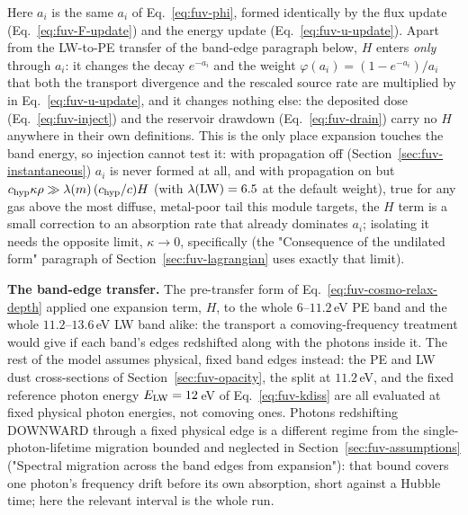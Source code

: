 Here $a_i$ is the same $a_i$ of Eq.~\ref{eq:fuv-phi}, formed identically by
the flux update (Eq.~\ref{eq:fuv-F-update}) and the energy update
(Eq.~\ref{eq:fuv-u-update}). Apart from the LW-to-PE transfer of the
band-edge paragraph below, $H$ enters \emph{only} through $a_i$: it changes the decay $e^{-a_i}$ and the
weight $\varphi(a_i) = (1-e^{-a_i})/a_i$ that both the transport
divergence and the rescaled source rate are multiplied by in
Eq.~\ref{eq:fuv-u-update}, and it changes nothing else: the deposited
dose (Eq.~\ref{eq:fuv-inject}) and the reservoir drawdown
(Eq.~\ref{eq:fuv-drain}) carry no $H$ anywhere in their own definitions.
This is the only place expansion touches the band energy, so injection
cannot test it: with propagation off (Section~\ref{sec:fuv-instantaneous})
$a_i$ is never formed at all, and with propagation on but
$c_{\rm hyp}\kappa\rho \gg \lambda(m)\,(c_{\rm hyp}/c)H$ (with $\lambda({\rm LW}) = 6.5$ at the default weight), true for any gas above the most
diffuse, metal-poor tail this module targets, the $H$ term is a small
correction to an absorption rate that already dominates $a_i$; isolating
it needs the opposite limit, $\kappa\to0$, specifically (the
"Consequence of the undilated form" paragraph of
Section~\ref{sec:fuv-lagrangian} uses exactly that limit).

\textbf{The band-edge transfer.} The pre-transfer form of
Eq.~\ref{eq:fuv-cosmo-relax-depth} applied one expansion term, $H$, to
the whole $6$--$11.2$\,eV PE band and the whole $11.2$--$13.6$\,eV LW
band alike: the transport a comoving-frequency treatment would give if
each band's edges redshifted along with the photons inside it. The rest
of the model assumes physical, fixed band edges instead: the PE and LW
dust cross-sections of Section~\ref{sec:fuv-opacity}, the split at
$11.2$\,eV, and the fixed reference photon energy $E_{\rm LW}=12$\,eV of
Eq.~\ref{eq:fuv-kdiss} are all evaluated at fixed physical photon
energies, not comoving ones. Photons redshifting DOWNWARD through a
fixed physical edge is a different regime from the single-photon-lifetime
migration bounded and neglected in Section~\ref{sec:fuv-assumptions}
("Spectral migration across the band edges from expansion"): that bound
covers one photon's frequency drift before its own absorption, short
against a Hubble time; here the relevant interval is the whole run.

